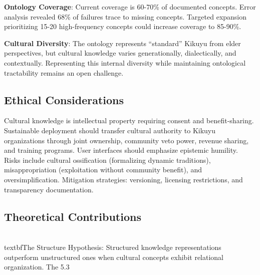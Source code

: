 \textbf{Ontology Coverage}: Current coverage is 60-70\% of documented concepts. Error analysis revealed 68\% of failures trace to missing concepts. Targeted expansion prioritizing 15-20 high-frequency concepts could increase coverage to 85-90\%.

\textbf{Cultural Diversity}: The ontology represents ``standard'' Kikuyu from elder perspectives, but cultural knowledge varies generationally, dialectically, and contextually. Representing this internal diversity while maintaining ontological tractability remains an open challenge.

\subsection{Ethical Considerations}
\label{subsec:ethics}

Cultural knowledge is intellectual property requiring consent and benefit-sharing. Sustainable deployment should transfer cultural authority to Kikuyu organizations through joint ownership, community veto power, revenue sharing, and training programs. User interfaces should emphasize epistemic humility. Risks include cultural ossification (formalizing dynamic traditions), misappropriation (exploitation without community benefit), and oversimplification. Mitigation strategies: versioning, licensing restrictions, and transparency documentation.

\subsection{Theoretical Contributions}
\label{subsec:theory}

\\textbf{The Structure Hypothesis}: Structured knowledge representations outperform unstructured ones when cultural concepts exhibit relational organization. The 5.3\\%
